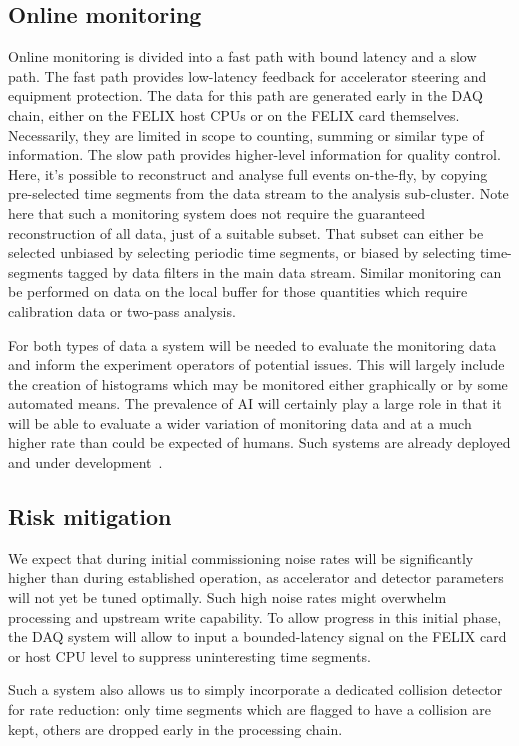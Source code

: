 \subsection{Online monitoring}\label{subsec:online_mon}
Online monitoring is divided into a fast path with bound latency and a slow path. The fast path provides low-latency feedback for accelerator steering and equipment protection. The data for this path are generated early in the DAQ chain, either on the FELIX host CPUs or on the FELIX card themselves. Necessarily, they are limited in scope to counting, summing or similar type of information. The slow path provides higher-level information for quality control. Here, it's possible to reconstruct and analyse full events on-the-fly, by copying pre-selected time segments from the data stream to the analysis sub-cluster. Note here that such a monitoring system does not require the guaranteed reconstruction of all data, just of a suitable subset. That subset can either be selected unbiased by selecting periodic time segments, or biased by selecting time-segments tagged by data filters in the main data stream.  Similar monitoring can be performed on data on the local buffer for those quantities which require calibration data or two-pass analysis.

For both types of data a system will be needed to evaluate the monitoring data and inform the experiment operators of potential issues. This will largely include the creation of histograms which may be monitored either graphically or by some automated means. The prevalence of AI will certainly play a large role in that it will be able to evaluate a wider variation of monitoring data and at a much higher rate than could be expected of humans. Such systems are already deployed and under development~\cite{Hydra2021}. 

\subsection{Risk mitigation}
We expect that during initial commissioning noise rates will be significantly higher than during established operation, as accelerator and detector parameters will not yet be tuned optimally. Such high noise rates might overwhelm processing and upstream write capability. To allow progress in this initial phase, the DAQ system will allow to input a bounded-latency signal on the FELIX card or host CPU level to suppress uninteresting time segments.

Such a system also allows us to simply incorporate a dedicated collision detector for rate reduction: only time segments which are flagged to have a collision are kept, others are dropped early in the processing chain. 

